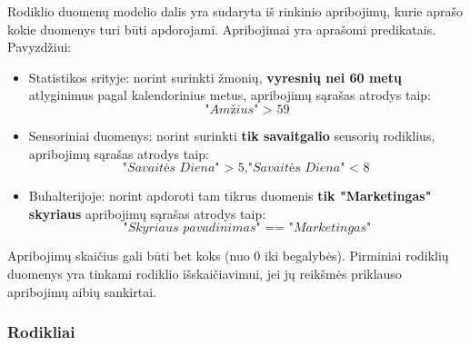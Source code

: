\documentclass{VUMIFPSbakalaurinis}
\begin{document}
Rodiklio duomenų modelio dalis yra sudaryta iš rinkinio apribojimų, kurie aprašo kokie duomenys turi būti apdorojami. Apribojimai yra aprašomi predikatais. Pavyzdžiui:
\begin{itemize}
    \item Statistikos srityje: norint surinkti žmonių, \textbf{vyresnių nei 60 metų} atlyginimus pagal kalendorinius metus, apribojimų sąrašas atrodys taip: \[\textit{"Amžius" > 59}\]
    \item Sensoriniai duomenys: norint surinkti \textbf{tik savaitgalio} sensorių rodiklius, apribojimų sąrašas atrodys taip: \[\textit{"Savaitės Diena" > 5}, \textit{"Savaitės Diena" < 8}\]
    \item Buhalterijoje: norint apdoroti tam tikrus duomenis \textbf{tik "Marketingas" skyriaus} apribojimų sąrašas atrodys taip: \[\textit{"Skyriaus pavadinimas" == "Marketingas"}\] 
\end{itemize} \par  
Apribojimų skaičius gali būti bet koks (nuo 0 iki begalybės). Pirminiai rodiklių duomenys yra tinkami rodiklio išskaičiavimui, jei jų reikšmės priklauso apribojimų aibių sankirtai.  

\subsubsection{Rodikliai}
\end{document}
